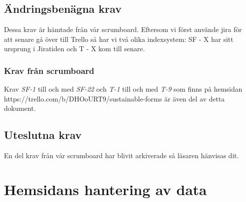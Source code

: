 \documentclass{article}
\begin{document}
    \vspace{1em}

\subsection{Ändringsbenägna krav}
Dessa krav är hämtade från vår scrumboard. Eftersom vi först använde jira för att senare gå över till Trello så har vi två olika indexsystem: SF - X har sitt ursprung i Jiratiden och T - X kom till senare.

\subsubsection{Krav från scrumboard}
Krav \textit{SF-1} till och med \textit{SF-22} och \textit{T-1} till och med \textit{T-9} som finns på hemsidan \\ https://trello.com/b/DHOoURT9/sustainable-forms är även del av detta dokument.


    \subsection{Uteslutna krav}
       En del krav från vår scrumboard har blivit arkiverade så läsaren hänvisas dit.
     
    \newpage
     \section{Hemsidans hantering av data}
    
\end{document}
